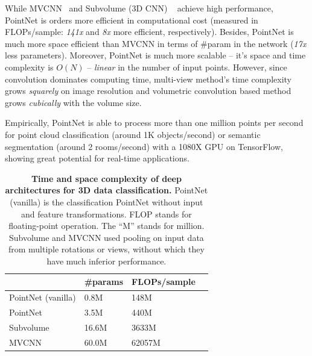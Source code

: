 While MVCNN~\cite{su15mvcnn} and Subvolume (3D CNN) ~\cite{qi2016volumetric} achieve high performance, PointNet is orders more efficient in computational cost (measured in FLOPs/sample: \emph{141x} and \emph{8x} more efficient, respectively). Besides, PointNet is much more space efficient than MVCNN in terms of \#param in the network (\emph{17x} less parameters).
Moreover, PointNet is much more scalable -- it's space and time complexity is $O(N)$ -- \emph{linear} in the number of input points. However, since convolution dominates computing time, multi-view method's time complexity grows \emph{squarely} on image resolution and volumetric convolution based method grows \emph{cubically} with the volume size.

Empirically, PointNet is able to process more than one million points per second for point cloud classification (around 1K objects/second) or semantic segmentation (around 2 rooms/second) with a 1080X GPU on TensorFlow, showing great potential for real-time applications. 

\begin{table}[h!]
    \centering
    \begin{tabular}{|l|l|l|l|}
    \hline
    ~                & \#params & FLOPs/sample\\ \hline
    PointNet (vanilla)  & 0.8M                        & 148M \\
    PointNet         & 3.5M                         & 440M \\ \hline
    Subvolume~\cite{qi2016volumetric} & 16.6M                        & 3633M \\ \hline
    MVCNN~\cite{su15mvcnn}   & 60.0M                          & 62057M \\ \hline
    \end{tabular}
    \caption{\textbf{Time and space complexity of deep architectures for 3D data classification.} PointNet (vanilla) is the classification PointNet without input and feature transformations. FLOP stands for floating-point operation.
    The ``M'' stands for million. Subvolume and MVCNN used pooling on input data from multiple rotations or views, without which they have much inferior performance.}
    \label{pointnet_complexity}
    \vspace{-3mm}
\end{table}